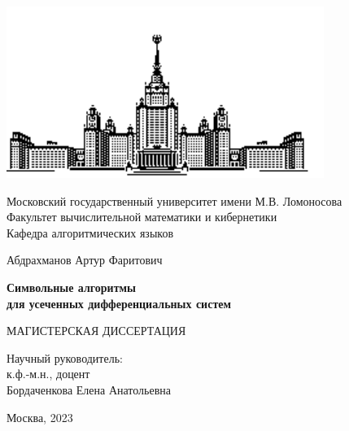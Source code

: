 \begin{titlepage}
    \begin{center}
        \includegraphics[scale=1]{титульник/msu-eps-converted-to.pdf}
        
        Московский государственный университет имени М.В. Ломоносова \\
        Факультет вычислительной математики и кибернетики \\
        Кафедра алгоритмических языков \\
        \vspace{1cm}

        \vspace{6em}

        Абдрахманов Артур Фаритович \\
    \end{center}

    \vspace{1.2em}

    \begin{center}
        \Large
        \textbf{Символьные алгоритмы \\
        для усеченных дифференциальных систем}
    \end{center}

    \vspace{5em}

    \begin{center}
        МАГИСТЕРСКАЯ ДИССЕРТАЦИЯ
    \end{center}
    
    \vspace{6em}

    \begin{flushright}
        Научный руководитель: \\
        к.ф.-м.н., доцент \\
        Бордаченкова Елена Анатольевна \\
    \end{flushright}

    \vspace{\fill}

    \begin{center}
        Москва, 2023
    \end{center}

\end{titlepage}